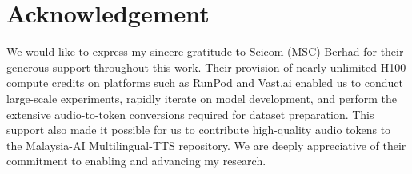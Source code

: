 \documentclass{article}
\begin{document}
\section{Acknowledgement}

We would like to express my sincere gratitude to Scicom (MSC) Berhad for their generous support throughout this work. Their provision of nearly unlimited H100 compute credits on platforms such as RunPod and Vast.ai enabled us to conduct large-scale experiments, rapidly iterate on model development, and perform the extensive audio-to-token conversions required for dataset preparation. This support also made it possible for us to contribute high-quality audio tokens to the Malaysia-AI Multilingual-TTS repository. We are deeply appreciative of their commitment to enabling and advancing my research.



\end{document}
